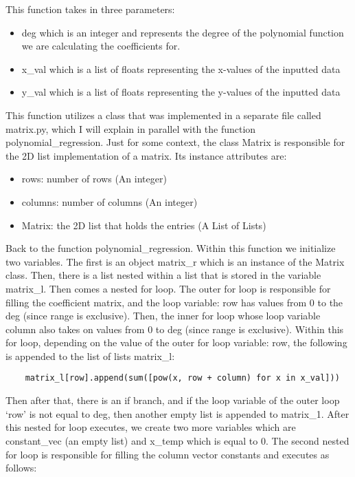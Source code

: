 \documentclass[fontsize=11pt]{article}
\begin{document}
This function takes in three parameters: 
\begin{itemize}
    \item deg which is an integer and represents the degree of the polynomial function we are calculating the coefficients for. 
    \item x\_val which is a list of floats representing the x-values of the inputted data
    \item y\_val which is a list of floats representing the y-values of the inputted data
\end{itemize}
This function utilizes a class that was implemented in a separate file called matrix.py, which I will explain in parallel with the function polynomial\_regression. Just for some context, the class Matrix is responsible for the  2D list implementation of a matrix. 
Its instance attributes are:
\begin{itemize}
    \item rows: number of rows (An integer)
    \item columns: number of columns (An integer)
    \item Matrix: the 2D list that holds the entries (A List of Lists)
\end{itemize}

Back to the function polynomial\_regression. Within this function we initialize two variables. The first is an object matrix\_r which is an instance of the Matrix class. Then, there is a list nested within a list that is stored in the variable matrix\_l. Then comes a nested for loop. The outer for loop is responsible for filling the coefficient matrix, and the loop variable: row has values from 0 to the deg (since range is exclusive). Then, the inner for loop whose loop variable column also takes on values from 0 to deg (since range is exclusive). Within this for loop, depending on the value of the outer for loop variable: row, the following is appended to the list of lists matrix\_l: 

\begin{verbatim}
    matrix_l[row].append(sum([pow(x, row + column) for x in x_val]))
\end{verbatim}
Then after that, there is an if branch, and if the loop variable of the outer loop ‘row’ is not equal to deg, then another empty list is appended to matrix\_1. After this nested for loop executes, we create two more variables which are constant\_vec (an empty list) and x\_temp which is equal to 0. The second nested for loop is responsible for filling the column vector constants and executes as follows:
\end{document}

